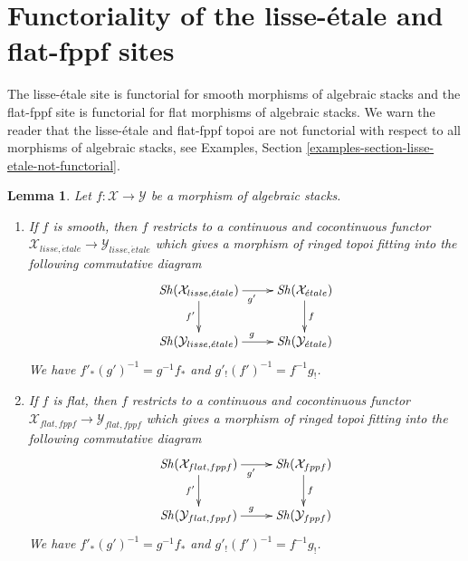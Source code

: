 \documentclass{stacks-project}
\theoremstyle{plain}
\newtheorem{lemma}[subsection]{Lemma}
\theoremstyle{definition}
\theoremstyle{remark}
\numberwithin{equation}{subsection}
\def\Sh{\mathop{\mathit{Sh}}\nolimits}
\def\etale{{\acute{e}tale}}
\begin{document}
\section{Functoriality of the lisse-\'etale and flat-fppf sites}
\label{section-lisse-etale-functorial}

\noindent
The lisse-\'etale site is functorial for smooth morphisms of algebraic stacks
and the flat-fppf site is functorial for flat morphisms of algebraic stacks.
We warn the reader that the lisse-\'etale and flat-fppf topoi are not
functorial with respect to all morphisms of algebraic stacks, see
Examples, Section \ref{examples-section-lisse-etale-not-functorial}.

\begin{lemma}
\label{lemma-lisse-etale-functorial}
Let $f : \mathcal{X} \to \mathcal{Y}$ be a morphism of algebraic stacks.
\begin{enumerate}
\item If $f$ is smooth, then $f$ restricts to a continuous and cocontinuous
functor
$\mathcal{X}_{lisse,\etale} \to \mathcal{Y}_{lisse,\etale}$
which gives a morphism of ringed topoi fitting into the following
commutative diagram
$$
\xymatrix{
\Sh(\mathcal{X}_{lisse,\etale}) \ar[r]_{g'} \ar[d]_{f'} &
\Sh(\mathcal{X}_\etale) \ar[d]^f \\
\Sh(\mathcal{Y}_{lisse,\etale}) \ar[r]^g &
\Sh(\mathcal{Y}_\etale)
}
$$
We have $f'_*(g')^{-1} = g^{-1}f_*$ and $g'_!(f')^{-1} = f^{-1}g_!$.
\item If $f$ is flat, then $f$ restricts to a continuous and cocontinuous
functor
$\mathcal{X}_{flat,fppf} \to \mathcal{Y}_{flat,fppf}$
which gives a morphism of ringed topoi fitting into the following
commutative diagram
$$
\xymatrix{
\Sh(\mathcal{X}_{flat,fppf}) \ar[r]_{g'} \ar[d]_{f'} &
\Sh(\mathcal{X}_{fppf}) \ar[d]^f \\
\Sh(\mathcal{Y}_{flat,fppf}) \ar[r]^g &
\Sh(\mathcal{Y}_{fppf})
}
$$
We have $f'_*(g')^{-1} = g^{-1}f_*$ and $g'_!(f')^{-1} = f^{-1}g_!$.
\end{enumerate}
\end{lemma}
\end{document}
